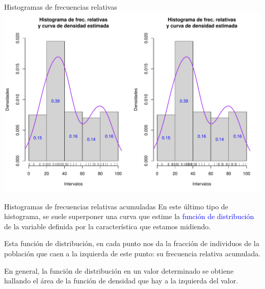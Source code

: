 \documentclass[
  ignorenonframetext,
]{beamer}
\newcommand\blue[1]{\textcolor{blue}{#1}}
\begin{document}
\begin{frame}{Histogramas de frecuencias relativas}
\label{histogramas-de-frecuencias-relativas-2}
\includegraphics{R_base_files/figure-beamer/unnamed-chunk-241-1.pdf}
\end{frame}

\begin{frame}{Histogramas de frecuencias relativas acumuladas}
\label{histogramas-de-frecuencias-relativas-acumuladas}
En este último tipo de histograma, se suele superponer una curva que
estime la \blue{función de distribución} de la variable definida por la
característica que estamos midiendo.

Esta función de distribución, en cada punto nos da la fracción de
individuos de la población que caen a la izquierda de este punto: su
frecuencia relativa acumulada.

En general, la función de distribución en un valor determinado se
obtiene hallando el área de la función de densidad que hay a la
izquierda del valor.
\end{frame}
\end{document}
